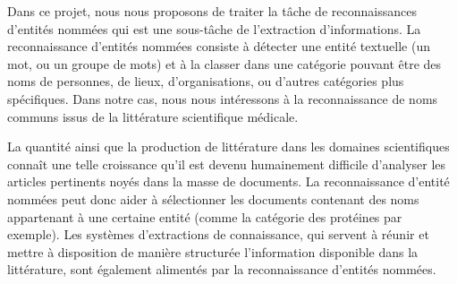Dans ce projet, nous nous proposons de traiter la tâche de reconnaissances d’entités nommées qui est une sous-tâche de l’extraction d’informations. La reconnaissance d’entités nommées consiste à détecter une entité textuelle (un mot, ou un groupe de mots) et à la classer dans une catégorie pouvant être des noms de personnes, de lieux, d’organisations, ou d’autres catégories plus spécifiques. Dans notre cas, nous nous intéressons à la reconnaissance de noms communs issus de la littérature scientifique médicale. 

La quantité ainsi que la production de littérature dans les domaines scientifiques connaît une telle croissance qu’il est devenu humainement difficile d’analyser les articles pertinents noyés dans la masse de documents. La reconnaissance d'entité nommées peut donc aider à sélectionner les documents contenant des noms appartenant à une certaine entité (comme la catégorie des protéines par exemple). Les systèmes d'extractions de connaissance, qui servent à réunir et mettre à disposition de manière structurée l'information disponible dans la littérature, sont également alimentés par la reconnaissance d'entités nommées.

\cite{greenwade93}